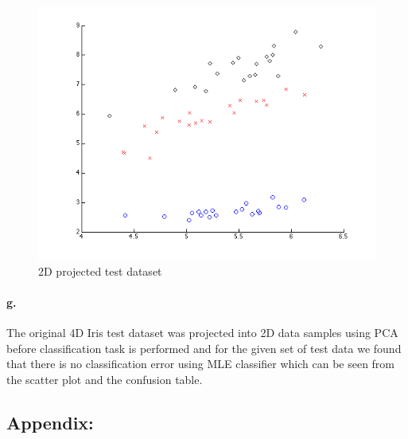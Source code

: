\documentclass[a4paper]{article}
\begin{document}
\begin{figure}[H]
  \centering
    \includegraphics[scale=.47]{images/2_f.png}
  \caption{2D projected test dataset}
\end{figure}
\paragraph{g.} The original 4D Iris test dataset was projected into 2D data samples using PCA before classification task is performed and for the given set of test data we found that there is no classification error using MLE classifier which can be seen from the scatter plot and the confusion table.\\





\newpage
\subsection*{Appendix:}














\end{document}
